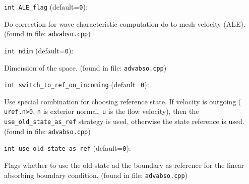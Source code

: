 \item\verb+int ALE_flag+ {\rm(default=\verb|0|)}:

Do correction for wave characteristic computation
 do to mesh velocity (ALE).
 (found in file: \verb+advabso.cpp+)
\item\verb+int ndim+ {\rm(default=\verb|0|)}:

Dimension of the space.
 (found in file: \verb+advabso.cpp+)
\item\verb+int switch_to_ref_on_incoming+ {\rm(default=\verb|0|)}:

Use special combination for choosing reference state.
 If velocity is outgoing ( \verb+uref.n>0+, \verb+n+ is exterior
 normal, \verb+u+ is the flow velocity), then the
 \verb+use_old_state_as_ref+ strategy is used, otherwise the
 state reference is used. 
 (found in file: \verb+advabso.cpp+)
\item\verb+int use_old_state_as_ref+ {\rm(default=\verb|0|)}:

Flags whether to use the old state ad the
boundary as reference for the linear absorbing
boundary condition.
 (found in file: \verb+advabso.cpp+)
